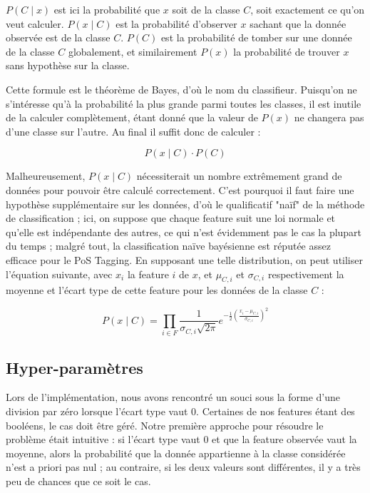 \documentclass[french, 14pt]{memoir}
\begin{document}
$P(C \mid x)$ est ici la probabilité que $x$ soit de la classe $C$, soit exactement ce qu'on veut calculer. $P(x \mid C)$ est la probabilité d'observer $x$ sachant que la donnée observée est de la classe $C$. $P(C)$ est la probabilité de tomber sur une donnée de la classe $C$ globalement, et similairement $P(x)$ la probabilité de trouver $x$ sans hypothèse sur la classe.

Cette formule est le théorème de Bayes, d'où le nom du classifieur. Puisqu'on ne s'intéresse qu'à la probabilité la plus grande parmi toutes les classes, il est inutile de la calculer complètement, étant donné que la valeur de $P(x)$ ne changera pas d'une classe sur l'autre. Au final il suffit donc de calculer :

\begin{equation}
P(x \mid C) \cdot P(C)
\end{equation}

Malheureusement, $P(x \mid C)$ nécessiterait un nombre extrêmement grand de données pour pouvoir être calculé correctement. C'est pourquoi il faut faire une hypothèse supplémentaire sur les données, d'où le qualificatif "naïf" de la méthode de classification ; ici, on suppose que chaque feature suit une loi normale et qu'elle est indépendante des autres, ce qui n'est évidemment pas le cas la plupart du temps ; malgré tout, la classification naïve bayésienne est réputée assez efficace pour le PoS Tagging. En supposant une telle distribution, on peut utiliser l'équation suivante, avec $x_i$ la feature $i$ de $x$, et $\mu_{C,i}$ et $\sigma_{C,i}$ respectivement la moyenne et l'écart type de cette feature pour les données de la classe $C$ :

\begin{equation}
P(x \mid C) = \prod _{i \in F} \frac{1}{\sigma_{C,i} \sqrt{2 \pi}} e^{-\frac {1} {2} (\frac {x_i - \mu_{C,i}} {\sigma_{C,i}})^2}
\end{equation}


\subsection{Hyper-paramètres}
Lors de l'implémentation, nous avons rencontré un souci sous la forme d'une division par zéro lorsque l'écart type vaut 0. Certaines de nos features étant des booléens, le cas doit être géré. Notre première approche pour résoudre le problème était intuitive : si l'écart type vaut 0 et que la feature observée vaut la moyenne, alors la probabilité que la donnée appartienne à la classe considérée n'est a priori pas nul ; au contraire, si les deux valeurs sont différentes, il y a très peu de chances que ce soit le cas.
\end{document}
